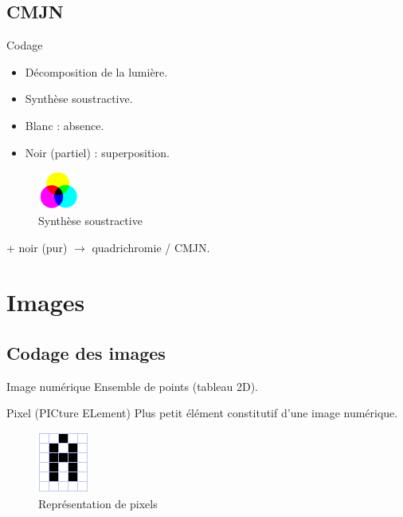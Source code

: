 \documentclass[14pt]{beamer}
\begin{document}
\subsection{CMJN}
\begin{frame}{Codage \subsecname}
    \begin{itemize}
    \item Décomposition de la lumière.
    \item Synthèse soustractive.
    \item Blanc : absence.
    \item Noir (partiel) : superposition.
    \end{itemize}
    \begin{figure}
    \centering
    \includegraphics[width=50px]{synthese_soustractive}
    \caption{Synthèse soustractive}
    \end{figure}     
    + noir (pur) $\rightarrow$ quadrichromie / CMJN.
\end{frame}


\section{Images}


\subsection{Codage des images}
\begin{frame}{\subsecname}
\begin{block}{Image numérique}
Ensemble de points (tableau 2D).
\end{block}
\begin{block}{Pixel (PICture ELement)}
Plus petit élément constitutif d'une image numérique.
\end{block}

\begin{figure}
\centering
\includegraphics[height=75px]{image_pixels}
\caption{Représentation de pixels}
\end{figure}
\end{frame}
\end{document}
